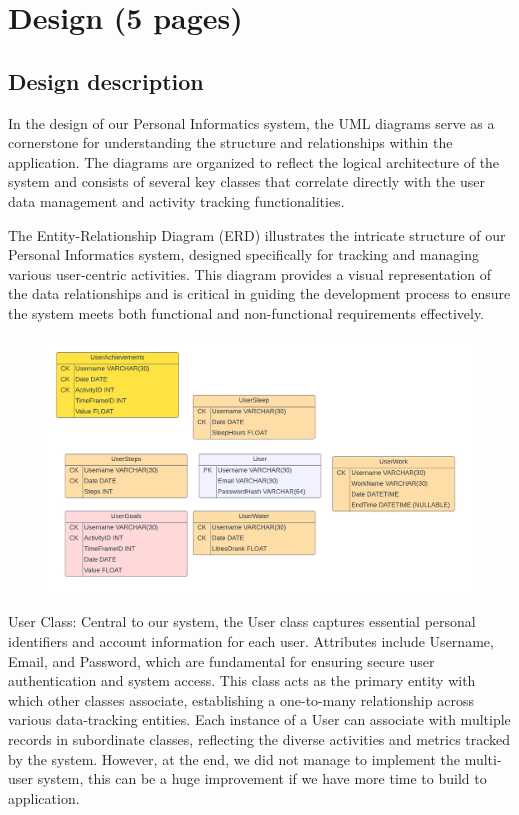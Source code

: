 \documentclass[12pt]{article}
\begin{document}
\newpage
\section{Design (5 pages)}
\subsection{Design description}
In the design of our Personal Informatics system, the UML diagrams serve as a cornerstone for understanding the structure and relationships within the application. The diagrams are organized to reflect the logical architecture of the system and consists of several key classes that correlate directly with the user data management and activity tracking functionalities.\par

The Entity-Relationship Diagram (ERD) illustrates the intricate structure of our Personal Informatics system, designed specifically for tracking and managing various user-centric activities. This diagram provides a visual representation of the data relationships and is critical in guiding the development process to ensure the system meets both functional and non-functional requirements effectively.\par

\begin{figure}[h]
\centering
\includegraphics{PI ERD}
\end{figure}

User Class: Central to our system, the User class captures essential personal identifiers and account information for each user. Attributes include Username, Email, and Password, which are fundamental for ensuring secure user authentication and system access. This class acts as the primary entity with which other classes associate, establishing a one-to-many relationship across various data-tracking entities. Each instance of a User can associate with multiple records in subordinate classes, reflecting the diverse activities and metrics tracked by the system. However, at the end, we did not manage to implement the multi-user system, this can be a huge improvement if we have more time to build to application.\par
\end{document}
